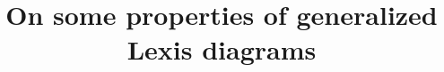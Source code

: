 \documentclass{bmcart}
\theoremstyle{definition}
\begin{document}
\begin{frontmatter}

\begin{fmbox}


\title{On some properties of generalized Lexis diagrams}


\author[
   email={riffe@mpidr.mpg.de}   %
]{ }
\author[
   email={riffe@mpidr.mpg.de}   %
]{ }






\begin{artnotes}
\end{artnotes}


\end{fmbox}
\end{frontmatter}
\end{document}
